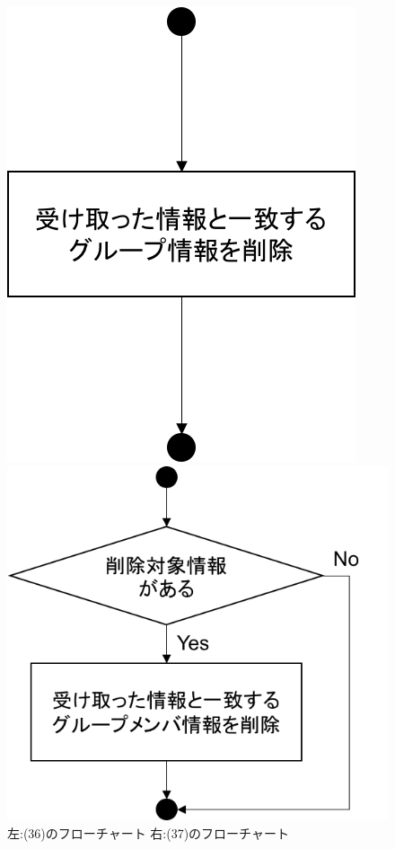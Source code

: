 \begin{figure}[htbp]
 \begin{minipage}{0.5\hsize}
  \begin{center}
   \includegraphics[width=0.6\linewidth,clip]{./img/flow/36.png}
  \end{center}
 \end{minipage}
 \begin{minipage}{0.5\hsize}
  \begin{center}
   \includegraphics[width=0.7\linewidth,clip]{./img/flow/37.png}
  \end{center}
 \end{minipage}
 \caption{左:(36)のフローチャート 右:(37)のフローチャート}\label{fig:36to37}
\end{figure}

